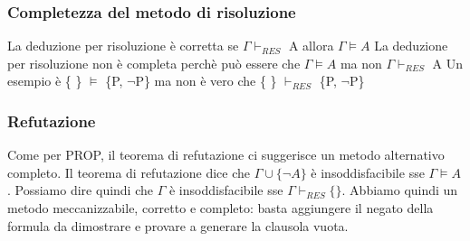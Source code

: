 \documentclass{article}
\begin{document}
\subsubsection{Completezza del metodo di risoluzione}
La deduzione per risoluzione è corretta	se $\Gamma \vdash _{RES}$ A allora $\Gamma \models A$ \newline
La deduzione per risoluzione non è completa perchè può essere che $\Gamma \models A$ ma non $\Gamma \vdash _{RES}$ A \newline
Un esempio è \{ \} $\models$ \{P, $\neg$P\} ma non è vero che \{ \} $\vdash _{RES}$ \{P, $\neg$P\}

\subsubsection{Refutazione}
Come per PROP, il teorema di refutazione ci suggerisce un metodo alternativo completo. 
Il teorema di refutazione dice che $\Gamma \cup \{\neg A\}$ è insoddisfacibile sse $\Gamma \models A$. \newline
Possiamo dire quindi che $\Gamma$ è insoddisfacibile sse $\Gamma \vdash _{RES} \{\}$. Abbiamo quindi un metodo meccanizzabile, corretto e completo: basta aggiungere il negato della formula da dimostrare e provare a generare la clausola vuota.
\end{document}

